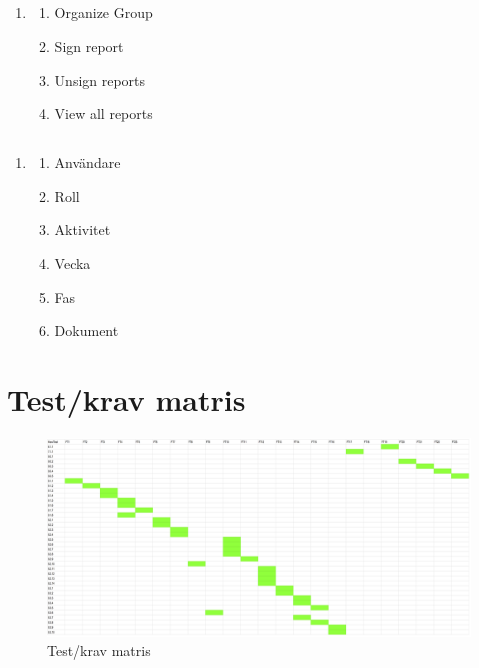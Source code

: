 \documentclass[paper=a4, fontsize=11pt,twoside]{article}
\begin{document}
\subsection{ }
\begin{enumerate}
\item[]
	\begin{enumerate}
	\item Organize Group
	\item Sign report
	\item Unsign reports
	\item View all reports
	\end{enumerate}
\end{enumerate}

\subsection{ }

\begin{enumerate}
\item[]
	\begin{enumerate}
	\item Användare
	\item Roll
	\item Aktivitet
	\item Vecka
	\item Fas
	\item Dokument
	\end{enumerate}
\end{enumerate}


\section{Test/krav matris}
\begin{figure}[H]
\centering
\includegraphics[width = 16cm]{SVVS_Matris.png} %
\caption{Test/krav matris}
\end{figure}
\end{document}
